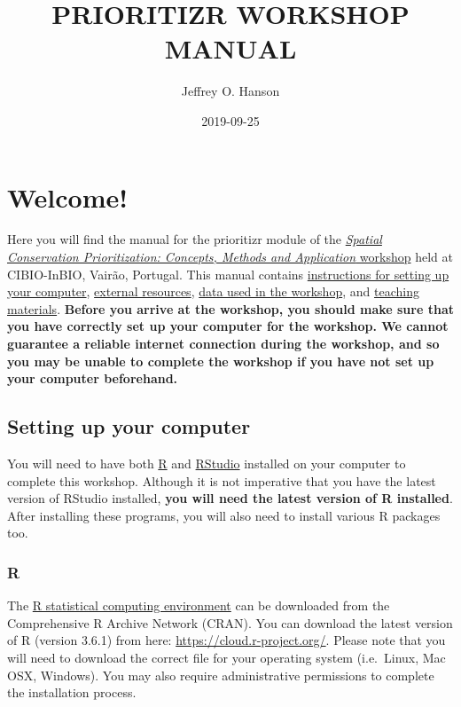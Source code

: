 \documentclass[]{book}
\title{PRIORITIZR WORKSHOP MANUAL}
\author{Jeffrey O. Hanson}
\date{2019-09-25}
\begin{document}
\maketitle

{
\setcounter{tocdepth}{1}
\tableofcontents
}
\chapter{Welcome!}\label{welcome}

Here you will find the manual for the prioritizr module of the
\href{https://cibio.up.pt/workshops--courses/details/advanced-course-spatial-conservation-prioritization-}{\emph{Spatial
Conservation Prioritization: Concepts, Methods and Application}
workshop} held at CIBIO-InBIO, Vairão, Portugal. This manual contains
\href{}{instructions for setting up your computer}, \href{}{external
resources}, \href{}{data used in the workshop}, and \href{}{teaching
materials}. \textbf{Before you arrive at the workshop, you should make
sure that you have correctly set up your computer for the workshop. We
cannot guarantee a reliable internet connection during the workshop, and
so you may be unable to complete the workshop if you have not set up
your computer beforehand.}

\section{Setting up your computer}\label{setting-up-your-computer}

You will need to have both \href{https://www.r-project.org/}{R} and
\href{https://www.rstudio.com/}{RStudio} installed on your computer to
complete this workshop. Although it is not imperative that you have the
latest version of RStudio installed, \textbf{you will need the latest
version of R installed}. After installing these programs, you will also
need to install various R packages too.

\subsection{R}\label{r}

The \href{https://www.r-project.org/}{R statistical computing
environment} can be downloaded from the Comprehensive R Archive Network
(CRAN). You can download the latest version of R (version 3.6.1) from
here: \url{https://cloud.r-project.org/}. Please note that you will need
to download the correct file for your operating system (i.e.~Linux, Mac
OSX, Windows). You may also require administrative permissions to
complete the installation process.
\end{document}

